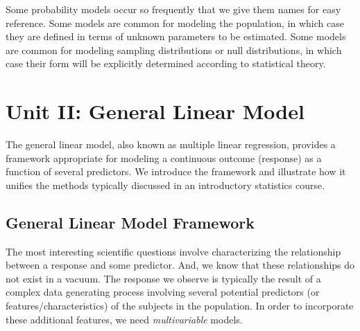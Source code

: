 \documentclass[
  letterpaper,
  DIV=11,
  numbers=noendperiod]{scrreprt}
\theoremstyle{definition}
\theoremstyle{definition}
\theoremstyle{remark}
\begin{document}
\begin{tcolorbox}[enhanced jigsaw, bottomrule=.15mm, titlerule=0mm, bottomtitle=1mm, colback=white, coltitle=black, rightrule=.15mm, leftrule=.75mm, toprule=.15mm, toptitle=1mm, left=2mm, opacityback=0, colframe=quarto-callout-tip-color-frame, breakable, title=\textcolor{quarto-callout-tip-color}{\faLightbulb}\hspace{0.5em}{Big Idea}, arc=.35mm, colbacktitle=quarto-callout-tip-color!10!white, opacitybacktitle=0.6]

Some probability models occur so frequently that we give them names for
easy reference. Some models are common for modeling the population, in
which case they are defined in terms of unknown parameters to be
estimated. Some models are common for modeling sampling distributions or
null distributions, in which case their form will be explicitly
determined according to statistical theory.

\end{tcolorbox}

\part{Unit II: General Linear Model}

The general linear model, also known as multiple linear regression,
provides a framework appropriate for modeling a continuous outcome
(response) as a function of several predictors. We introduce the
framework and illustrate how it unifies the methods typically discussed
in an introductory statistics course.

\hypertarget{sec-glm-model-framework}{%
\chapter{General Linear Model Framework}\label{sec-glm-model-framework}}

\providecommand{\norm}[1]{\lVert#1\rVert}
\providecommand{\abs}[1]{\lvert#1\rvert}
\providecommand{\dist}[1]{\stackrel{\text{#1}}{\sim}}
\providecommand{\ind}[1]{\mathbb{I}\left(#1\right)}
\providecommand{\bm}[1]{\mathbf{#1}}
\providecommand{\bs}[1]{\boldsymbol{#1}}
\providecommand{\Ell}{\mathcal{L}}
\providecommand{\indep}{\perp\negthickspace\negmedspace\perp}

The most interesting scientific questions involve characterizing the
relationship between a response and some predictor. And, we know that
these relationships do not exist in a vacuum. The response we observe is
typically the result of a complex data generating process involving
several potential predictors (or features/characteristics) of the
subjects in the population. In order to incorporate these additional
features, we need \emph{multivariable} models.
\end{document}

